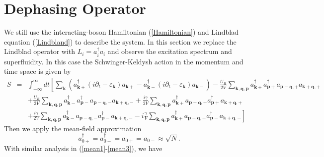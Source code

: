 \documentclass[aps,onecolumn,superscriptaddress,notitlepage,longbibliography]{revtex4-1}
\begin{document}
\section{Dephasing Operator}

We still use the interacting-boson Hamiltonian (\ref{Hamiltonian}) and
Lindblad equation (\ref{Lindbland}) to describe the system. In this section we
replace the Lindblad operator with $L_i = a_i^{\dagger} a_i$ and observe the
excitation spectrum and superfluidity. In this case the Schwinger-Keldysh
action in the momentum and time space is given by
\begin{eqnarray}
  S & = & \int_{- \infty}^{\infty} d t \left[ \sum_{\mathbf{k}}
  (a^{\dagger}_{\mathbf{k}+} (i \partial_t - \varepsilon_{\mathbf{k}})
  a_{\mathbf{k}+} - a^{\dagger}_{\mathbf{k}-} (i \partial_t -
  \varepsilon_{\mathbf{k}}) a_{\mathbf{k}-}) - \frac{U_R}{2 V}
  \sum_{\mathbf{k}, \mathbf{q}, \mathbf{p}} a_{\mathbf{k}+}^{\dagger}
  a_{\mathbf{p}+}^{\dagger} a_{\mathbf{p}-\mathbf{q}, +}
  a_{\mathbf{k}+\mathbf{q}, +} \right. \nonumber\\
  &  & + \frac{U_R}{2 V} \sum_{\mathbf{k}, \mathbf{q}, \mathbf{p}}
  a_{\mathbf{k}-}^{\dagger} a_{\mathbf{p}-}^{\dagger}
  a_{\mathbf{p}-\mathbf{q}, -} a_{\mathbf{k}+\mathbf{q}, -} + \frac{i
  \gamma}{2 V} \sum_{\mathbf{k}, \mathbf{q}, \mathbf{p}}
  a_{\mathbf{k}+}^{\dagger} a_{\mathbf{p}-\mathbf{q}, +}
  a_{\mathbf{p}+}^{\dagger} a_{\mathbf{k}+\mathbf{q}, +} \nonumber\\
  &  & + \frac{i \gamma}{2 V} \sum_{\mathbf{k}, \mathbf{q}, \mathbf{p}}
  a_{\mathbf{k}-}^{\dagger} a_{\mathbf{p}-\mathbf{q}, -}
  a_{\mathbf{p}-}^{\dagger} a_{\mathbf{k}+\mathbf{q}, -} - i
  \frac{\gamma}{V} \left. \sum_{\mathbf{k}, \mathbf{q}, \mathbf{p}}
  a_{\mathbf{k}+}^{\dagger} a_{\mathbf{p}-\mathbf{q}, +}
  a_{\mathbf{p}-}^{\dagger} a_{\mathbf{k}+\mathbf{q}, -} \right] 
\end{eqnarray}
Then we apply the mean-field approximation
\begin{equation}
  a_{0 +}^{\dagger} = a_{0 -}^{\dagger} = a_{0 +} = a_{0 -} \approx \sqrt{N} .
\end{equation}
With similar analysis in (\ref{mean1}-\ref{mean3}), we have
\end{document}
